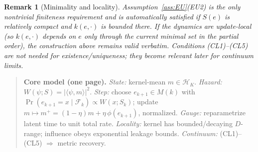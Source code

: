 \documentclass[12pt,a4paper]{article}
\newtheorem{remark}{Remark}
\newcommand{\Mset}{M}        %
\begin{document}
\begin{remark}[Minimality and locality]
Assumption~\ref{ass:EU}(EU2) is the only nontrivial finiteness requirement and is automatically satisfied if
$S(e)$ is relatively compact and $k(e,\cdot)$ is bounded there. If the dynamics are \emph{update-local}
(so $k(e,\cdot)$ depends on $e$ only through the current minimal set in the partial order),
the construction above remains valid verbatim. Conditions (CL1)--(CL5) are \emph{not} needed for existence/uniqueness;
they become relevant later for continuum limits.
\end{remark}



\begin{quote}\small
\textbf{Core model (one page).}\;
\emph{State:} kernel‑mean \(m\in\mathcal H_K\).
\;\; \emph{Hazard:} \(W(\psi;S)=|\langle \psi, m\rangle|^2\).
\;\; \emph{Step:} choose \(e_{k+1}\in \Mset(k)\) with \(\Pr(e_{k+1}=x\mid\mathcal F_k)\propto W(x;S_k)\);
update \(m\mapsto m^+=(1-\eta)m+\eta\,\phi(e_{k+1})\), normalized.
\;\; \emph{Gauge:} reparametrize latent time to unit total rate.
\;\; \emph{Locality:} kernel has bounded/decaying \(D\)-range; influence obeys exponential leakage bounds.
\;\; \emph{Continuum:} (CL1)–(CL5) \(\Rightarrow\) metric recovery.
\end{quote}
  
\end{document}
